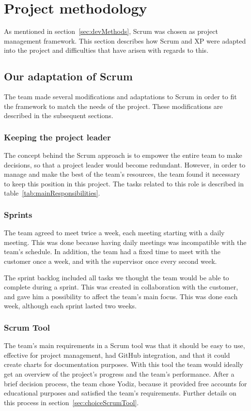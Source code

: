 \newpage
\section{Project methodology}
\label{sec:scrumDevProcess}

As mentioned in section~\ref{sec:devMethods}, Scrum was chosen as project management framework. 
This section describes how Scrum and XP were adapted into the project and difficulties that have arisen with regards to this.

\subsection{Our adaptation of Scrum}
The team made several modifications and adaptations to Scrum in order to fit the framework to match the needs of the project. These modifications are described in the subsequent sections.

\subsubsection{Keeping the project leader}
The concept behind the Scrum approach is to empower the entire team to make decisions, so that a project leader would become redundant. However, in order to manage and make the best of the team's resources, the team found it necessary to keep this position in this project. The tasks related to this role is described in table~\ref{tab:mainResponsibilities}.

\subsubsection{Sprints}
The team agreed to meet twice a week, each meeting starting with a daily meeting. This was done because having daily meetings was incompatible with the team's schedule. In addition, the team had a fixed time to meet with the customer once a week, and with the supervisor once every second week.

The sprint backlog included all tasks we thought the team would be able to complete during a sprint. This was created in collaboration with the customer, and gave him a possibility to affect the team's main focus. This was done each week, although each sprint lasted two weeks.

\subsubsection{Scrum Tool}
\label{sec:scrumtool}
The team's main requirements in a Scrum tool was that it should be easy to use, effective for project management, had GitHub integration, and that it could create charts for documentation purposes. With this tool the team would ideally get an overview of the project's progress and the team's performance. After a brief decision process, the team chose Yodiz, because it provided free accounts for educational purposes and satisfied the team's requirements. Further details on this process in section~\ref{sec:choiceScrumTool}.

